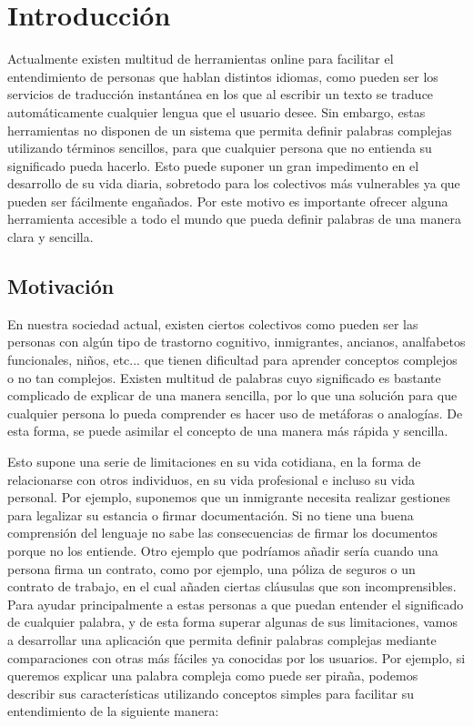 \chapter{Introducción}
\label{cap:introduccion}


Actualmente existen multitud de herramientas online para facilitar el entendimiento de personas que hablan distintos idiomas, como pueden ser los servicios de traducción instantánea en los que al escribir un texto se traduce automáticamente cualquier lengua que el usuario desee. Sin embargo, estas herramientas no disponen de un sistema que permita definir palabras complejas utilizando términos sencillos, para que cualquier persona que no entienda su significado pueda hacerlo. Esto puede suponer un gran impedimento en el desarrollo de su vida diaria, sobretodo para los colectivos más vulnerables ya que pueden ser fácilmente engañados.
Por este motivo es importante ofrecer alguna herramienta accesible a todo el mundo que pueda definir palabras de una manera clara y sencilla.

	


\section{Motivación}
\label{cap:sec:motivacion}

En nuestra sociedad actual, existen ciertos colectivos como pueden ser las personas con algún tipo de trastorno cognitivo, inmigrantes, ancianos, analfabetos funcionales, niños, etc... que tienen dificultad para aprender conceptos complejos o no tan complejos. 
Existen multitud de palabras cuyo significado es bastante complicado de explicar de una manera sencilla, por lo que una solución para que cualquier persona lo pueda comprender es hacer uso de metáforas o analogías. De esta forma, se puede asimilar el concepto de una manera más rápida y sencilla. 

Esto supone una serie de limitaciones en su vida cotidiana, en la forma de relacionarse con otros individuos, en su vida profesional e incluso su vida personal. Por ejemplo, suponemos que un inmigrante necesita realizar gestiones para legalizar su estancia o firmar documentación. Si no tiene una buena comprensión del lenguaje no sabe las consecuencias de firmar los documentos porque no los entiende. 
Otro ejemplo que podríamos añadir sería cuando una persona firma un contrato, como por ejemplo, una póliza de seguros o un contrato de trabajo, en el cual añaden ciertas cláusulas que son incomprensibles. 
\newline
Para ayudar principalmente a estas personas a que puedan entender el significado de cualquier palabra, y de esta forma superar algunas de sus limitaciones, vamos a desarrollar una aplicación que permita definir palabras complejas mediante comparaciones con otras más fáciles ya conocidas por los usuarios. Por ejemplo, si queremos explicar una palabra compleja como puede ser piraña, podemos describir sus características utilizando conceptos simples para facilitar su entendimiento de la siguiente manera: \newline

